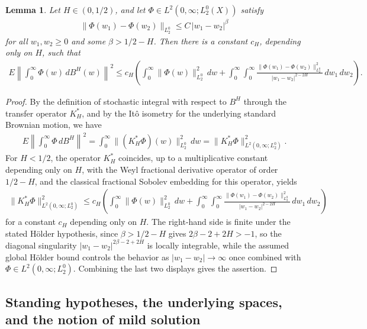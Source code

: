 \documentclass[11pt]{amsart}
\newtheorem{lemma}[theorem]{Lemma}
\begin{document}
\begin{lemma}\label{covbound}
Let $H\in(0,1/2)$, and let $\Phi\in L^2(0,\infty;L^0_2(X))$ satisfy
\begin{align*}
\|\Phi(w_1)-\Phi(w_2)\|_{L^0_2}\le C\,|w_1-w_2|^{\beta}
\end{align*}
for all $w_1,w_2\ge0$ and some $\beta>1/2-H$. Then there is a constant $c_H$, depending only on $H$, such that
\begin{align*}
E\left\|\int_0^\infty \Phi(w)\,dB^H(w)\right\|^2\le c_H\left(\int_0^\infty\|\Phi(w)\|^2_{L^0_2}\,dw+\int_0^\infty\int_0^\infty\frac{\|\Phi(w_1)-\Phi(w_2)\|^2_{L^0_2}}{|w_1-w_2|^{2-2H}}\,dw_1\,dw_2\right).
\end{align*}
\end{lemma}

\begin{proof}
By the definition of stochastic integral with respect to $B^H$ through the transfer operator $K_H^*$, and by the It\^{o} isometry for the underlying standard Brownian motion, we have
\begin{align*}
E\left\|\int_0^\infty \Phi\,dB^H\right\|^2=\int_0^\infty\|(K_H^\ast\Phi)(w)\|^2_{L^0_2}\,dw=\|K_H^\ast\Phi\|^2_{L^2(0,\infty;L^0_2)}.
\end{align*}
For $H<1/2$, the operator $K_H^\ast$ coincides, up to a multiplicative constant depending only on $H$, with the Weyl fractional derivative operator of order $1/2-H$, and the classical fractional Sobolev embedding for this operator, yields
\begin{align*}
\|K_H^\ast\Phi\|^2_{L^2(0,\infty;L^0_2)}\le c_H\left(\int_0^\infty\|\Phi(w)\|^2_{L^0_2}\,dw+\int_0^\infty\int_0^\infty\frac{\|\Phi(w_1)-\Phi(w_2)\|^2_{L^0_2}}{|w_1-w_2|^{2-2H}}\,dw_1\,dw_2\right)
\end{align*}
for a constant $c_H$ depending only on $H$. The right-hand side is finite under the stated H\"older hypothesis, since $\beta>1/2-H$ gives $2\beta-2+2H>-1$, so the diagonal singularity $|w_1-w_2|^{2\beta-2+2H}$ is locally integrable, while the assumed global H\"older bound controls the behavior as $|w_1-w_2|\to\infty$ once combined with $\Phi\in L^2(0,\infty;L^0_2)$. Combining the last two displays gives the assertion.
\end{proof}

\subsection{Standing hypotheses, the underlying spaces, and the notion of mild solution}
\end{document}
